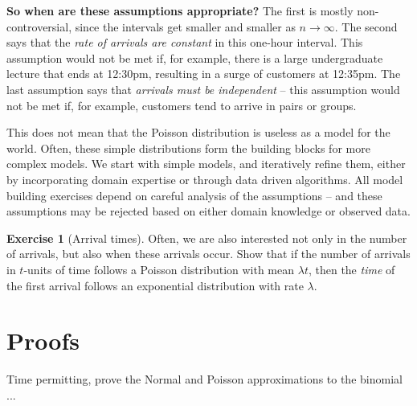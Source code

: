 \documentclass[11pt]{article}
\theoremstyle{definition}
\newtheorem{exercise}[]{Exercise}
\begin{document}
\textbf{So when are these assumptions appropriate?} The first is
mostly non-controversial,
since the intervals get smaller and smaller as  $n\rightarrow\infty$.
The second says that the \textit{rate of arrivals are constant} in this one-hour interval.
This assumption would not be met if, for example, there is a large undergraduate lecture that ends at 12:30pm, resulting in a surge of customers at 12:35pm.
The last assumption says that \textit{arrivals must be independent} -- this assumption would not be met if,
for example, customers tend to arrive in pairs or groups.

This does not mean that the Poisson distribution is useless as a model for the world.
Often, these simple distributions form the building blocks for more complex models. We start with simple models,
and iteratively refine them, either by incorporating
domain expertise or through data driven algorithms.
All model building exercises depend on careful analysis of the assumptions --
and these assumptions may be rejected based on either
domain knowledge or observed data.

\begin{exercise}[Arrival times]
Often, we are also interested not only in the number of arrivals,
but also when these arrivals occur.
Show that if the number of arrivals in $t$-units of time
follows a Poisson distribution with mean $\lambda t$,
then the \textit{time} of the first arrival follows an exponential distribution with rate $\lambda$.
\end{exercise}

\section{Proofs}

Time permitting, prove the Normal and Poisson approximations
to the binomial ...
\end{document}
